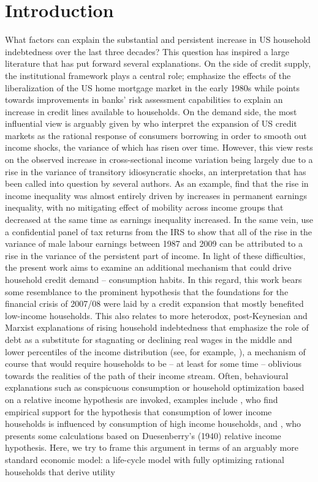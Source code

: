 \section{Introduction}\label{sec:intro}
What factors can explain the substantial and persistent increase in US household indebtedness over the last three decades? This question has inspired a large literature that has put forward several explanations. On the side of credit supply, the institutional framework plays a central role; \citet{CampbellHercovitz2005} emphasize the effects of the liberalization of the US home mortgage market in the early 1980s while \citet{Narajabad2012} points towards improvements in banks' risk assessment capabilities to explain an increase in credit lines available to households. On the demand side, the most influential view is arguably given by \citet{KruegerPerri2006} who interpret the expansion of US credit markets as the rational response of consumers borrowing in order to smooth out income shocks, the variance of which has risen over time. However, this view rests on the observed increase in cross-sectional income variation being largely due to a rise in the variance of transitory idiosyncratic shocks, an interpretation that has been called into question by several authors. As an example, \citet{KopczukSaezSong2010} find that the rise in income inequality was almost entirely driven by increases in permanent earnings inequality, with no mitigating effect of mobility across income groups that decreased at the same time as earnings inequality increased. In the same vein, \citet{DHPRV2013} use a confidential panel of tax returns from the IRS to show that all of the rise in the variance of male labour earnings between 1987 and 2009 can be attributed to a rise in the variance of the persistent part of income. In light of these difficulties, the present work aims to examine an additional mechanism that could drive household credit demand -- consumption habits. In this regard, this work bears some resemblance to the prominent \citet{Rajan2011} hypothesis that the foundations for the financial crisis of 2007/08 were laid by a credit expansion that mostly benefited low-income households. This also relates to more heterodox, post-Keynesian and Marxist explanations of rising household indebtedness that emphasize the role of debt as a substitute for stagnating or declining real wages in the middle and lower percentiles of the income distribution (see, for example, \citealp{BarbaPivetti2009}), a mechanism of course that would require households to be -- at least for some time -- oblivious towards the realities of the path of their income stream. Often, behavioural explanations such as conspicuous consumption or household optimization based on a relative income hypothesis are invoked, examples include \citet{BertrandMorse2012}, who find empirical support for the hypothesis that consumption of lower income households is influenced by consumption of high income households, and \citet{vanTreeck2012}, who presents some calculations based on Duesenberry's (1940) relative income hypothesis. Here, we try to frame this argument in terms of an arguably more standard economic model: a life-cycle model with fully optimizing rational households that derive utility 
